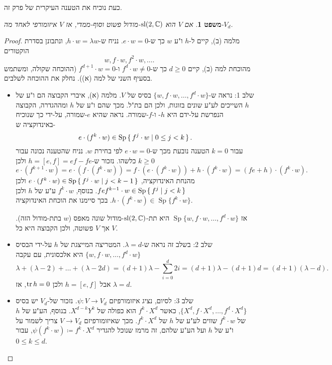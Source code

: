 \documentclass{report}
\theoremstyle{break}
\newtheorem{theorem}{משפט}[chapter]
\theoremstyle{MyNonumberbreak}
\newtheorem{proof}{הוכחה}
\DeclareMathOperator{\Sp}{Sp}
\begin{document}
כעת נוכיח את הטענה העיקרית של פרק זה.
\begin{theorem}
	אם $V$ הוא $\operatorname{sl}(2, \operatorname{\mathbb{C}})$-מודול פשוט וסוף-ממדי, אז $V$ איזומורפי לאחד מה-$V_d$.
\end{theorem}
\begin{proof}
	מלמה (ב), קיים ל-$h$ ו"ע $w$ כך ש-$e \cdot w = 0$. נניח ש-$h \cdot w = \lambda w$, ונתבונן בסדרת הוקטורים
	\[ w, f \cdot w, f^2 \cdot w, \ldots. \]
	מהוכחת למה (ב), קיים $d \ge 0$ כך ש-$f^d \cdot w \neq 0$ ו-$f^{d+1} \cdot w = 0$ (ההוכחה שקולה, ומשתמש בסעיף השני של למה (א)). נחלק את ההוכחה לשלבים.
	\begin{itemize}
		\item 
		שלב 1: נראה ש-$\{w, f \cdot w, \ldots, f^d \cdot w\}$ בסיס של $V$. מלמה (א), איברי הקבוצה הם ו"ע של $h$ השייכים לע"ע שונים בזוגות, ולכן הם בת"ל. מכך שהם ו"ע של $h$ ומההגדרה, הקבוצה הנפרשת על-ידם היא $h$- ו-$f$-שמורה. נראה שהיא $e$-שמורה, על-ידי כך שנוכיח באינדוקציה ש-
		\[ e \cdot (f^k \cdot w) \in \Sp\set{f^j \cdot w | 0 \le j < k}. \]
		עבור $k = 0$ הטענה נובעת מכך ש-$e \cdot w = 0$ לפי בחירת $w$. נניח שהטענה נכונה עבור $k \ge 0$ כלשהו. נזכור ש-$h = [e, f] = ef - fe$ ולכן
		\[ e \cdot (f^{k+1} \cdot w) = e \cdot (f \cdot (f^k \cdot w)) = f \cdot (e \cdot (f^k \cdot w)) + h \cdot (f^k \cdot w) = (fe + h) \cdot (f^k \cdot w). \]
		מהנחת האינדוקציה, $e \cdot (f^k \cdot w) \in \Sp\set{f^j \cdot w | j < k-1}$ ולכן $fef^{k-1} \cdot w \in \Sp\set{f^j | j < k}$. בנוסף, $f^k \cdot w$ ע"ע של $h$ ולכן $h \cdot (f^k \cdot w) \in \Sp\{f^k \cdot w\}$. בכך סיימנו את הוכחת האינדוקציה.
		
		אז $\Sp\{w, f \cdot w, \ldots, f^d \cdot w\}$ היא תת-$\operatorname{sl}(2, \operatorname{\mathbb{C}})$-מודול שונה מאפס ($w$ בתת-מודול הזה). אך $V$ פשוטה, ולכן הקבוצה היא כל $V$.
		\item
		שלב 2: בשלב זה נראה ש-$\lambda = d$. המטריצה המייצגת של $h$ על-ידי הבסיס $\{w, f \cdot w, \ldots, f^d \cdot w\}$ היא אלכסונית, עם עקבה
		\[ \lambda + (\lambda - 2) + \ldots + (\lambda - 2d) = (d + 1)\lambda - \sum_{i=0}^d 2i = (d + 1)\lambda - (d + 1)d = (d + 1)(\lambda - d). \]
		אבל $h = [e, f]$ ולכן $\operatorname{tr} h = 0$, אז $\lambda = d$.
		\item
		שלב 3: לסיום, נציג איזומורפיזם $\psi : V \to V_d$. נזכור של-$V_d$ יש בסיס $\{X^d, f \cdot X^d, \ldots, f^d \cdot X^d\}$, כאשר $f^k \cdot X^d$ הוא כפולה של $X^{d-k}Y^k$. בנוסף, הע"ע של $h$ של $f^k \cdot w$ שווים לע"ע של $h$ של $f^k \cdot X^d$. מכך שאיזומורפיזם $V \to V_d$ צריך לשמור על ו"ע של $h$ ועל הע"ע שלהם, זה מרמז שנוכל להגדיר $\psi(f^k \cdot w) \coloneqq f^k \cdot X^d$, עבור $0 \le k \le d$.
		

\end{itemize}
\end{proof}
\end{document}
